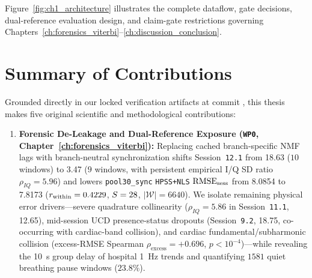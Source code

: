 Figure~\ref{fig:ch1_architecture} illustrates the complete dataflow, gate decisions, dual-reference
evaluation design, and claim-gate restrictions governing Chapters~\ref{ch:forensics_viterbi}--\ref{ch:discussion_conclusion}.



\section{Summary of Contributions}
\label{sec:ch1_contributions}

Grounded directly in our locked verification artifacts at commit \FrozenGitCommit{}, this thesis
makes five original scientific and methodological contributions:

\begin{enumerate}\emergencystretch=1.5em
  \item \textbf{Forensic De-Leakage and Dual-Reference Exposure (\texttt{WP0}, Chapter~\ref{ch:forensics_viterbi}):}
    Replacing cached branch-specific NMF lags with branch-neutral synchronization shifts
    Session~\texttt{12.1} from \SI{18.63}{\bpm} ($10$ windows) to \SI{3.47}{\bpm} ($9$ windows,
    with persistent empirical I/Q SD ratio $\rho_{IQ}=5.96$) and lowers \texttt{pool30\_\allowbreak sync}
    \texttt{HPSS+\allowbreak NLS} $\mathrm{RMSE}_{\mathrm{sess}}$ from \SI{8.0854}{} to \SI{7.8173}{\bpm} ($r_{\mathrm{within}} =
    0.4229$, $S=28$, $|\mathcal{W}|=6640$). We isolate remaining physical error drivers---severe
    quadrature collinearity ($\rho_{IQ} = 5.86$ in Session~\texttt{11.1}, \SI{12.65}{\bpm}),
    mid-session UCD presence-status dropouts (Session~\texttt{9.2}, \SI{18.75}{\bpm}, co-occurring
    with cardiac-band collision), and cardiac fundamental/subharmonic collision (excess-RMSE
    Spearman $\rho_{\mathrm{excess}} = +0.696$, $p < 10^{-4}$)---while revealing the
    \SI{10}{\second} group delay of hospital \SI{1}{\hertz} trends and quantifying $1581$ quiet
    breathing pause windows ($23.8\%$).


\end{enumerate}

